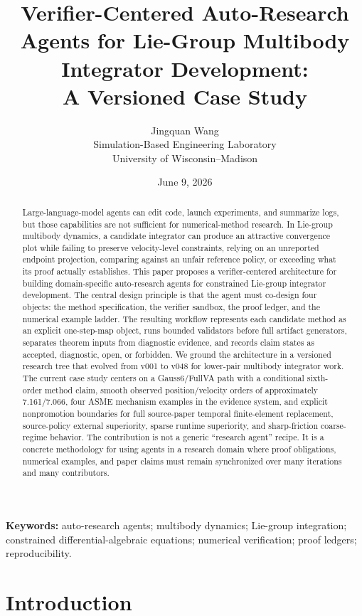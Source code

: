 \documentclass[10pt]{article}
\title{\vspace{-1.0em}
Verifier-Centered Auto-Research Agents for Lie-Group Multibody Integrator Development:\\
A Versioned Case Study}
\author{Jingquan Wang\\Simulation-Based Engineering Laboratory\\University of Wisconsin--Madison}
\date{June 9, 2026}
\newcommand{\method}{Gauss6/FullVA}
\begin{document}
\maketitle

\begin{abstract}
Large-language-model agents can edit code, launch experiments, and summarize
logs, but those capabilities are not sufficient for numerical-method research.
In Lie-group multibody dynamics, a candidate integrator can produce an
attractive convergence plot while failing to preserve velocity-level
constraints, relying on an unreported endpoint projection, comparing against an
unfair reference policy, or exceeding what its proof actually establishes.
This paper proposes a verifier-centered architecture for building
domain-specific auto-research agents for constrained Lie-group integrator
development. The central design principle is that the agent must co-design
four objects: the method specification, the verifier sandbox, the proof ledger,
and the numerical example ladder. The resulting workflow represents each
candidate method as an explicit one-step-map object, runs bounded validators
before full artifact generators, separates theorem inputs from diagnostic
evidence, and records claim states as accepted, diagnostic, open, or
forbidden. We ground the architecture in a versioned research tree that evolved
from v001 to v048 for lower-pair multibody integrator work. The current case
study centers on a \method{} path with a conditional sixth-order method claim,
smooth observed position/velocity orders of approximately 7.161/7.066, four
ASME mechanism examples in the evidence system, and explicit nonpromotion
boundaries for full source-paper temporal finite-element replacement,
source-policy external superiority, sparse runtime superiority, and
sharp-friction coarse-regime behavior. The contribution is not a generic
``research agent'' recipe. It is a concrete methodology for using agents in a
research domain where proof obligations, numerical examples, and paper claims
must remain synchronized over many iterations and many contributors.
\end{abstract}

\noindent\textbf{Keywords:} auto-research agents; multibody dynamics;
Lie-group integration; constrained differential-algebraic equations; numerical
verification; proof ledgers; reproducibility.

\section{Introduction}
\end{document}
